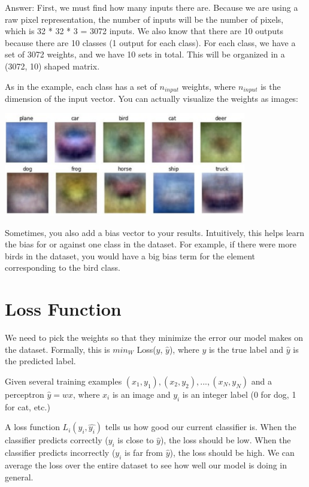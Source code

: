 \documentclass{article}
\begin{document}
Answer: First, we must find how many inputs there are. Because we are using a raw pixel representation, the number of inputs will be the number of pixels, which is 32 * 32 * 3 = 3072 inputs. We also know that there are 10 outputs because there are 10 classes (1 output for each class). For each class, we have a set of 3072 weights, and we have 10 sets in total. This will be organized in a (3072, 10) shaped matrix.

\bigskip

As in the example, each class has a set of $n_{input}$ weights, where $n_{input}$ is the dimension of the input vector. You can actually visualize the weights as images:

\includegraphics[width=400px]{weights.png}

Sometimes, you also add a bias vector to your results. Intuitively, this helps learn the bias for or against one class in the dataset. For example, if there were more birds in the dataset, you would have a big bias term for the element corresponding to the bird class.

\section{Loss Function}

We need to pick the weights so that they minimize the error our model makes on the dataset. Formally, this is $min_W$ Loss($y$, $\hat{y}$), where $y$ is the true label and $\hat{y}$ is the predicted label.

Given several training examples ${(x_1, y_1), (x_2, y_2), ..., (x_N, y_N)}$ and a perceptron $\hat{y} = wx$, where $x_i$ is an image and $y_i$ is an integer label (0 for dog, 1 for cat, etc.)

A loss function $L_i(y_i, \hat{y_i})$ tells us how good our current classifier is. When the classifier predicts correctly ($y_i$ is close to $\hat{y}$), the loss should be low. When the classifier predicts incorrectly ($y_i$ is far from $\hat{y}$), the loss should be high. We can average the loss over the entire dataset to see how well our model is doing in general.
\end{document}
